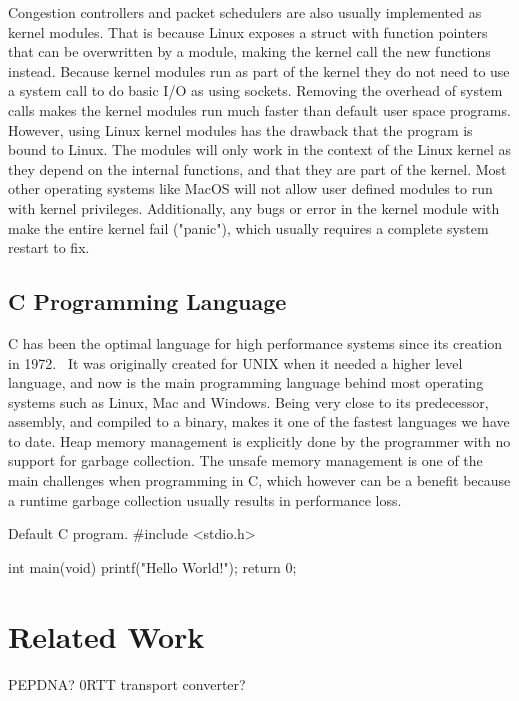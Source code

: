 \documentclass[a4paper,english, 11pt]{report}
\begin{document}
Congestion controllers and packet schedulers are also usually implemented as kernel modules. That is because Linux exposes a struct with function pointers that can be overwritten by a module, making the kernel call the new functions instead. Because kernel modules run as part of the kernel they do not need to use a system call to do basic I/O as using sockets. Removing the overhead of system calls makes the kernel modules run much faster than default user space programs.\\

However, using Linux kernel modules has the drawback that the program is bound to Linux. The modules will only work in the context of the Linux kernel as they depend on the internal functions, and that they are part of the kernel. Most other operating systems like MacOS will not allow user defined modules to run with kernel privileges. Additionally, any bugs or error in the kernel module with make the entire kernel fail ("panic"), which usually requires a complete system restart to fix.

\subsection{C Programming Language}
C has been the optimal language for high performance systems since its creation in 1972.~\cite{c_programming_language} It was originally created for UNIX when it needed a higher level language, and now is the main programming language behind most operating systems such as Linux, Mac and Windows. Being very close to its predecessor, assembly, and compiled to a binary, makes it one of the fastest languages we have to date. Heap memory management is explicitly done by the programmer with no support for garbage collection. The unsafe memory management is one of the main challenges when programming in C, which however can be a benefit because a runtime garbage collection usually results in performance loss.

\begin{autonumlstlisting}[label=lst:hello_world]{Default C program.}
#include <stdio.h>

int main(void)
{
	printf("Hello World!");
	return 0;
}

\end{autonumlstlisting}

\section{Related Work}
PEPDNA? 0RTT transport converter?
\end{document}

